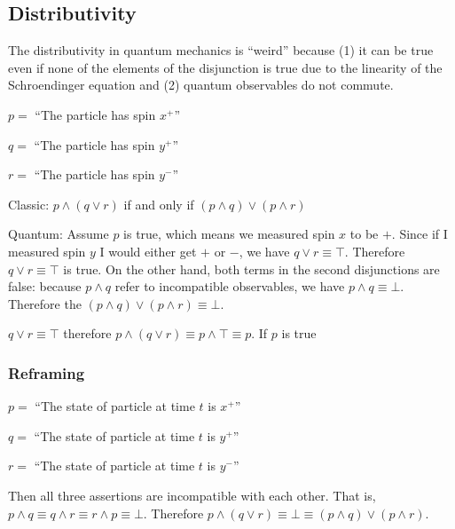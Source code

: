 \documentclass[10pt,twocolumn, nofootinbib]{revtex4-1}
\begin{document}
\subsection{Distributivity}

The distributivity in quantum mechanics is ``weird'' because (1) it can be true even if none of the elements of the disjunction is true due to the linearity of the Schroendinger equation and (2) quantum observables do not commute. 

\begin{description}
    \item $p =$ ``The particle has spin $x^+$''
    \item $q =$ ``The particle has spin $y^+$''
    \item $r =$ ``The particle has spin $y^-$''
\end{description}

Classic: $p \wedge (q \vee r)$ if and only if $(p \wedge  q) \vee (p \wedge r)$

Quantum: Assume $p$ is true, which means we measured spin $x$ to be $+$. Since if I measured spin $y$ I would either get $+$ or $-$, we have $q \vee r \equiv \top$. Therefore $q \vee r \equiv \top$ is true. On the other hand, both terms in the second disjunctions are false: because $p \wedge  q$ refer to incompatible observables, we have $p \wedge  q \equiv \bot$. Therefore the $(p \wedge  q) \vee (p \wedge r) \equiv \bot$.

$q \vee r \equiv \top$ therefore $p \wedge (q \vee r) \equiv p \wedge \top \equiv p$. If $p$ is true

\subsubsection{Reframing}

\begin{description}
    \item $p =$ ``The state of particle at time $t$ is $x^+$''
    \item $q =$ ``The state of particle at time $t$ is $y^+$''
    \item $r =$ ``The state of particle at time $t$ is $y^-$''
\end{description}

Then all three assertions are incompatible with each other. That is, $p \wedge q \equiv q \wedge r \equiv r \wedge p \equiv \bot$. Therefore $p \wedge (q \vee r) \equiv \bot \equiv (p \wedge  q) \vee (p \wedge r)$.
\end{document}
